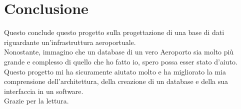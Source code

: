 
\newpage

\section{Conclusione}

\textsf{\small Questo conclude questo progetto sulla progettazione di una base di dati riguardante un'infrastruttura aeroportuale.}\\

\textsf{\small Nonostante, immagino che un database di un vero Aeroporto sia molto più grande e complesso di quello che ho fatto io, spero possa esser stato d'aiuto.}\\

\textsf{\small Questo progetto mi ha sicuramente aiutato molto e ha migliorato la mia comprensione dell'architettura, della creazione di un database e della sua interfaccia in un software.}\\

\textsf{\small Grazie per la lettura.}\\

\flushright
\flushleft
\author{Luca Rengo}